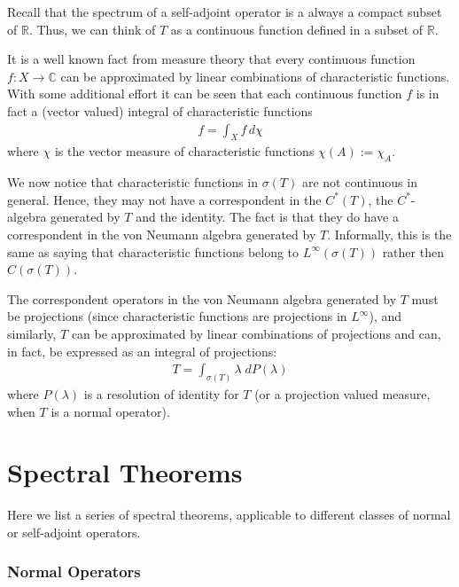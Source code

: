 \documentclass[12pt]{article}
\begin{document}
Recall that the spectrum of a self-adjoint operator is a always a compact subset of $\mathbb{R}$. Thus, we can think of $T$ as a continuous function defined in a subset of $\mathbb{R}$.

It is a well known fact from measure theory that every continuous function $f:X \longrightarrow \mathbb{C}$ can be approximated by linear combinations of characteristic functions. With some additional effort it can be seen that each continuous function $f$ is in fact a (vector valued) integral of characteristic functions
\begin{align*}
\displaystyle f = \int_X f\, d\chi
\end{align*}
where $\chi$ is the vector measure of characteristic functions $\chi(A):= \chi_A$.

We now notice that characteristic functions in $\sigma(T)$ are not continuous in general. Hence, they may not have a correspondent in the $C^*(T)$, the $C^*$-algebra generated by $T$ and the identity. The  fact is that they do have a correspondent in the von Neumann algebra generated by $T$. Informally, this is the same as saying that characteristic functions belong to $L^{\infty}(\sigma(T))$ rather then $C(\sigma(T))$.

The correspondent operators in the von Neumann algebra generated by $T$ must be projections (since characteristic functions are projections in $L^{\infty}$), and similarly, $T$ can be approximated by linear combinations of projections and can, in fact, be expressed as an integral of projections:
\begin{align*}
T= \int_{\sigma(T)} \lambda \;dP(\lambda)
\end{align*}
where $P(\lambda)$ is a resolution of identity for $T$ (or a projection valued measure, when $T$ is a normal operator).

\section{Spectral Theorems}

Here we list a series of spectral theorems, applicable to different classes of normal or self-adjoint operators.

\subsubsection{Normal Operators}
\end{document}
